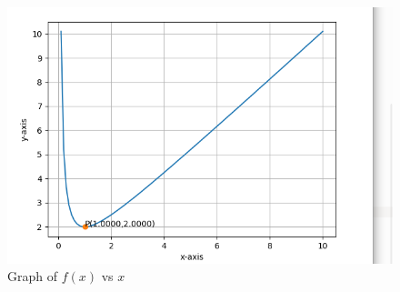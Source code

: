 \documentclass[journal,10pt,twocolumn]{article}
\begin{document}
\begin{figure}[t]
	\centering
	\includegraphics[width=1\columnwidth]{opt.pdf}
	\caption{Graph of $f(x)$ vs $x$}
	\label{fig:graph_fx}
\end{figure}
\end{document}
